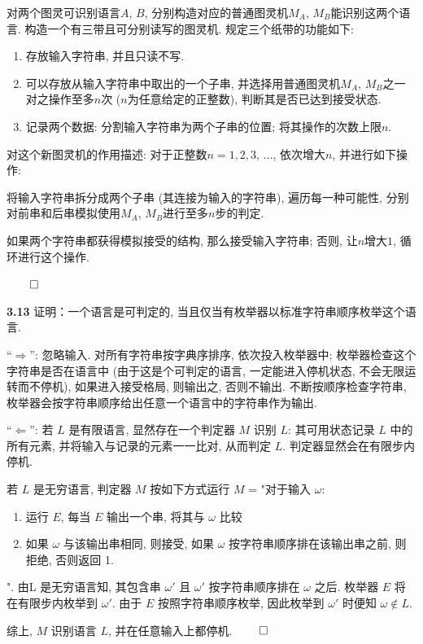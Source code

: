 \documentclass[UTF8]{report}
\newcommand{\problem}[1]{{\setlength{\parskip}{10pt}\noindent \bf{#1}}}
\renewenvironment{proof}{{\setlength{\parskip}{7pt}\noindent\hskip 2em \bf 证明 \quad}}{\hfill$\qed$\par}
\begin{document}
\begin{proof}
    对两个图灵可识别语言$A$, $B$, 分别构造对应的普通图灵机$M_A$, $M_B$能识别这两个语言. 构造一个有三带且可分别读写的图灵机. 规定三个纸带的功能如下:
    \begin{enumerate}
        \item 存放输入字符串, 并且只读不写.
        \item 可以存放从输入字符串中取出的一个子串, 并选择用普通图灵机$M_A$, $M_B$之一对之操作至多$n$次 ($n$为任意给定的正整数), 判断其是否已达到接受状态.
        \item 记录两个数据: 分割输入字符串为两个子串的位置; 将其操作的次数上限$n$.
    \end{enumerate}

    对这个新图灵机的作用描述: 对于正整数$n=1,2,3,\,\dots$, 依次增大$n$, 并进行如下操作:
    
    将输入字符串拆分成两个子串 (其连接为输入的字符串), 遍历每一种可能性, 分别对前串和后串模拟使用$M_A$, $M_B$进行至多$n$步的判定.
    
    如果两个字符串都获得模拟接受的结构, 那么接受输入字符串; 否则, 让$n$增大$1$, 循环进行这个操作.

\end{proof}


\problem{3.13} 证明：一个语言是可判定的, 当且仅当有枚举器以标准字符串顺序枚举这个语言. 

\begin{proof}
    ``$\Longrightarrow$'': 忽略输入. 对所有字符串按字典序排序, 依次投入枚举器中; 枚举器检查这个字符串是否在语言中 (由于这是个可判定的语言, 一定能进入停机状态, 不会无限运转而不停机), 如果进入接受格局, 则输出之, 否则不输出. 不断按顺序检查字符串, 枚举器会按字符串顺序给出任意一个语言中的字符串作为输出.

    ``$\Longleftarrow$'': 若 $L$ 是有限语言, 显然存在一个判定器 $M$ 识别 $L$: 其可用状态记录 $L$ 中的所有元素, 并将输入与记录的元素一一比对, 从而判定 $L$. 判定器显然会在有限步内停机.
    
    若 $L$ 是无穷语言, 判定器 $M$ 按如下方式运行 $M$ = "对于输入 $\omega$:
    \begin{enumerate}
        \item 运行 $E$, 每当 $E$ 输出一个串, 将其与 $\omega$ 比较
        \item 如果 $\omega$ 与该输出串相同, 则接受, 如果 $\omega$ 按字符串顺序排在该输出串之前, 则拒绝, 否则返回 1. 
    \end{enumerate}
    ". 由L 是无穷语言知, 其包含串 $\omega'$ 且 $\omega'$ 按字符串顺序排在 $\omega$ 之后. 枚举器 $E$ 将在有限步内枚举到 $\omega'$. 由于 $E$ 按照字符串顺序枚举, 因此枚举到 $\omega'$ 时便知 $\omega \notin L$.

    综上, $M$ 识别语言 $L$, 并在任意输入上都停机. 
\end{proof}
\end{document}
